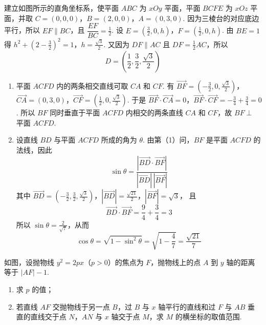 \begin{solution}
建立如图所示的直角坐标系，使平面 \(ABC\) 为 \(xOy\) 平面，平面 \(BCFE\) 为 \(xOz\) 平面，并取
\(C=(0,0,0)\)，\(B=(2,0,0)\)，\(A=(0,3,0)\).
因为三棱台的对应底边平行，所以 \(EF\parallel BC\)，且 \(\dfrac{EF}{BC}=\frac12\). 设 \(E=(\frac32,0,h)\)，\(F=(\frac12,0,h)\). 由 \(BE=1\) 得
\(h^2+\left(2-\frac32\right)^2=1\)，\(h=\frac{\sqrt3}{2}\).
又因为 \(DF\parallel AC\) 且 \(DF=\frac12AC\)，所以
\[
D=\left(\frac12,\frac32,\frac{\sqrt3}{2}\right)
\]

\begin{enumerate}
\item 平面 \(ACFD\) 内的两条相交直线可取 \(CA\) 和 \(CF\). 有
\(\overrightarrow{BF}=\left(-\frac32,0,\frac{\sqrt3}{2}\right)\)，\(\overrightarrow{CA}=(0,3,0)\)，\(\overrightarrow{CF}=\left(\frac12,0,\frac{\sqrt3}{2}\right)\).
于是
\(\overrightarrow{BF}\cdot\overrightarrow{CA}=0\)，\(\overrightarrow{BF}\cdot\overrightarrow{CF}=-\frac34+\frac34=0\).
所以 \(BF\) 同时垂直于平面 \(ACFD\) 内相交的两条直线 \(CA\) 和 \(CF\)，故 \(BF\perp\) 平面 \(ACFD\).

\item 设直线 \(BD\) 与平面 \(ACFD\) 所成的角为 \(\theta\). 由第（1）问，\(BF\) 是平面 \(ACFD\) 的法线，因此
\[
\sin\theta=\frac{|\overrightarrow{BD}\cdot\overrightarrow{BF}|}{|\overrightarrow{BD}|\,|\overrightarrow{BF}|}
\]
其中
\(\overrightarrow{BD}=\left(-\frac32,\frac32,\frac{\sqrt3}{2}\right)\)，\(|\overrightarrow{BD}|=\frac{\sqrt{21}}2\)，\(|\overrightarrow{BF}|=\sqrt3\)，
且
\[
\overrightarrow{BD}\cdot\overrightarrow{BF}=\frac94+\frac34=3
\]
所以 \(\sin\theta=\frac{2}{\sqrt7}\)，从而
\[
\cos\theta=\sqrt{1-\sin^2\theta}=\sqrt{1-\frac47}=\frac{\sqrt{21}}7
\]
\end{enumerate}
\end{solution}

\begin{problem}
如图，设抛物线 \(y^2=2px\)（\(p>0\)）的焦点为 \(F\)，抛物线上的点 \(A\) 到 \(y\) 轴的距离等于 \(|AF|-1\).

\begin{enumerate}
\item 求 \(p\) 的值；
\item 若直线 \(AF\) 交抛物线于另一点 \(B\)，过 \(B\) 与 \(x\) 轴平行的直线和过 \(F\) 与 \(AB\) 垂直的直线交于点 \(N\)，\(AN\) 与 \(x\) 轴交于点 \(M\)，求 \(M\) 的横坐标的取值范围.
\end{enumerate}

\end{problem}

